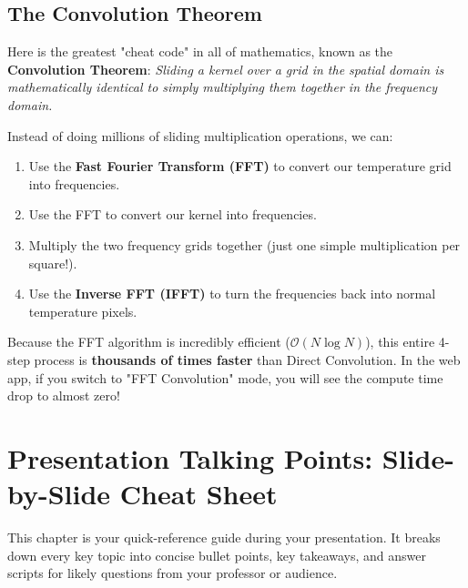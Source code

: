 \documentclass[11pt]{book}
\begin{document}
\section{The Convolution Theorem}
Here is the greatest "cheat code" in all of mathematics, known as the \textbf{Convolution Theorem}:
\textit{Sliding a kernel over a grid in the spatial domain is mathematically identical to simply multiplying them together in the frequency domain.}

Instead of doing millions of sliding multiplication operations, we can:
\begin{enumerate}
    \item Use the \textbf{Fast Fourier Transform (FFT)} to convert our temperature grid into frequencies.
    \item Use the FFT to convert our kernel into frequencies.
    \item Multiply the two frequency grids together (just one simple multiplication per square!).
    \item Use the \textbf{Inverse FFT (IFFT)} to turn the frequencies back into normal temperature pixels.
\end{enumerate}

Because the FFT algorithm is incredibly efficient ($\mathcal{O}(N \log N)$), this entire 4-step process is \textbf{thousands of times faster} than Direct Convolution. In the web app, if you switch to "FFT Convolution" mode, you will see the compute time drop to almost zero!

\chapter{Presentation Talking Points: Slide-by-Slide Cheat Sheet}
This chapter is your quick-reference guide during your presentation. It breaks down every key topic into concise bullet points, key takeaways, and answer scripts for likely questions from your professor or audience.
\end{document}
